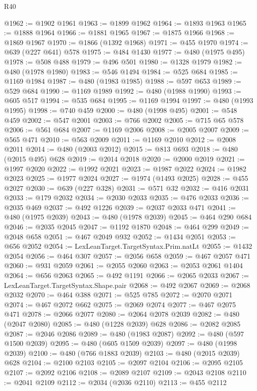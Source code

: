 \begin{lexlean}{R40}
\begin{coremodule}
{{{{{{{{{{{{{{{{{{{{{{{{{{{{{{{{{{{{{{{{{{{{{{{{{{{{{{{{{{{{{{{{{{{{{{{{{{{{{{{{{{{{{{{{{{{{{{{{{{{{{{{{{{{{{@1962 := @1902 @1961
@1963 := @1899 @1962
@1964 := @1893 @1963
@1965 := @1888 @1964
@1966 := @1881 @1965
@1967 := @1875 @1966
@1968 := @1869 @1967
@1970 := @1866 (@1392 @1968)
@1971 := @455 @1970
@1974 := @639 (@227 @641) @578
@1975 := @484 @1430
@1977 := @480 (@1975 @495)
@1978 := @508 @488
@1979 := @496 @501
@1980 := @1328 @1979
@1982 := @480 (@1978 @1980)
@1983 := @546 @1494
@1984 := @525 @684
@1985 := @1169 @1984
@1987 := @480 (@1983 @1985)
@1988 := @597 @653
@1989 := @529 @684
@1990 := @1169 @1989
@1992 := @480 (@1988 @1990)
@1993 := @605 @517
@1994 := @535 @684
@1995 := @1169 @1994
@1997 := @480 (@1993 @1995)
@1998 := @740 @459
@2000 := @480 (@1998 @495)
@2001 := @548 @459
@2002 := @547 @2001
@2003 := @766 @2002
@2005 := @715 @65 @578
@2006 := @561 @684
@2007 := @1169 @2006
@2008 := @2005 @2007
@2009 := @565 @471
@2010 := @563 @2009
@2011 := @1169 @2010
@2012 := @2008 @2011
@2014 := @480 (@2003 @2012)
@2015 := @813 @693
@2018 := @480 (@2015 @495) @628
@2019 := @2014 @2018
@2020 := @2000 @2019
@2021 := @1997 @2020
@2022 := @1992 @2021
@2023 := @1987 @2022
@2024 := @1982 @2023
@2025 := @1977 @2024
@2027 := @1974 (@1493 @2025)
@2028 := @455 @2027
@2030 := @639 (@227 @328)
@2031 := @571 @32
@2032 := @416 @2031
@2033 := @179 @2032
@2034 := @2030 @2033
@2035 := @476 @2033
@2036 := @2035 @469
@2037 := @492 @1226
@2039 := @2037 @2033 @471
@2041 := @480 (@1975 @2039)
@2043 := @480 (@1978 @2039)
@2045 := @464 @290 @684
@2046 := @2035 @2045
@2047 := @1192 @1870
@2048 := @464 @299
@2049 := @2048 @658
@2051 := @467 @2049 @932
@2052 := @1434 @2051
@2053 := @656 @2052
@2054 := LexLeanTarget.TargetSyntax.Prim.natLt
@2055 := @1432 @2054
@2056 := @464 @307
@2057 := @2056 @658
@2059 := @467 @2057 @471
@2060 := @931 @2059
@2061 := @2055 @2060
@2063 := @2053 @2061 @1404
@2064 := @656 @2063
@2065 := @492 @1191
@2066 := @2065 @2033
@2067 := LexLeanTarget.TargetSyntax.Shape.pair
@2068 := @492 @2067
@2069 := @2068 @2032
@2070 := @464 @388
@2071 := @525 @785
@2072 := @2070 @2071
@2074 := @467 @2072 @662
@2075 := @2069 @2074
@2077 := @467 @2075 @471
@2078 := @2066 @2077
@2080 := @2064 @2078 @2039
@2082 := @480 (@2047 @2080)
@2085 := @480 (@1228 @2039) @628
@2086 := @2082 @2085
@2087 := @2046 @2086
@2089 := @480 (@1983 @2087)
@2092 := @480 (@597 @1500 @2039)
@2095 := @480 (@605 @1509 @2039)
@2097 := @480 (@1998 @2039)
@2100 := @480 (@766 @1883 @2039)
@2103 := @480 (@2015 @2039) @628
@2104 := @2100 @2103
@2105 := @2097 @2104
@2106 := @2095 @2105
@2107 := @2092 @2106
@2108 := @2089 @2107
@2109 := @2043 @2108
@2110 := @2041 @2109
@2112 := @2034 (@2036 @2110)
@2113 := @455 @2112
}}}}}}}}}}}}}}}}}}}}}}}}}}}}}}}}}}}}}}}}}}}}}}}}}}}}}}}}}}}}}}}}}}}}}}}}}}}}}}}}}}}}}}}}}}}}}}}}}}}}}}}}}}}}}
\end{coremodule}
\end{lexlean}
